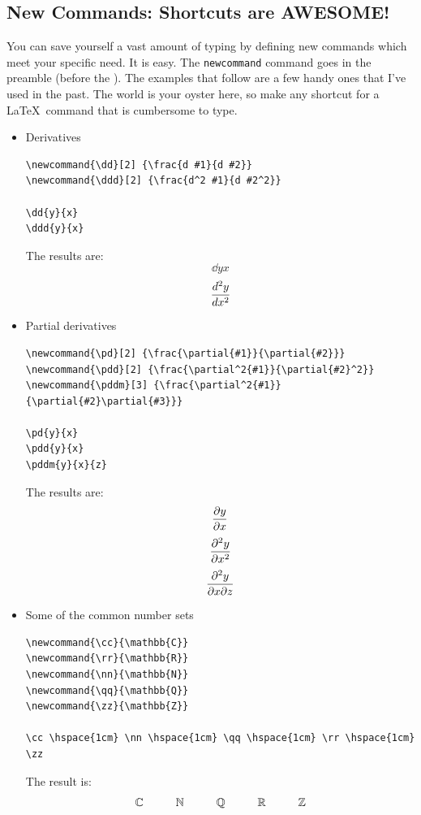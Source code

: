 \subsection{New Commands: Shortcuts are AWESOME!}
You can save yourself a vast amount of typing by defining new commands which meet your
specific need. It is easy. The \texttt{newcommand}  command goes in the preamble (before
the \verb||). The examples that follow are a few handy ones that I've used
in the past.  The world is your oyster here, so make any shortcut for a \LaTeX\ command
that is cumbersome to type.
\begin{itemize}
    \item Derivatives
\begin{verbatim}
\newcommand{\dd}[2] {\frac{d #1}{d #2}}
\newcommand{\ddd}[2] {\frac{d^2 #1}{d #2^2}}

\dd{y}{x}
\ddd{y}{x}
\end{verbatim}

The results are:\\
\[\dd{y}{x}\]
\[\ddd{y}{x}\]

\item Partial derivatives
\begin{verbatim}
\newcommand{\pd}[2] {\frac{\partial{#1}}{\partial{#2}}}
\newcommand{\pdd}[2] {\frac{\partial^2{#1}}{\partial{#2}^2}}
\newcommand{\pddm}[3] {\frac{\partial^2{#1}}{\partial{#2}\partial{#3}}}

\pd{y}{x}
\pdd{y}{x}
\pddm{y}{x}{z}
\end{verbatim}

The results are:\\
\[\pd{y}{x}\]
\[\pdd{y}{x}\]
\[\pddm{y}{x}{z}\]

\item Some of the common number sets
\begin{verbatim}
\newcommand{\cc}{\mathbb{C}}
\newcommand{\rr}{\mathbb{R}}
\newcommand{\nn}{\mathbb{N}}
\newcommand{\qq}{\mathbb{Q}}
\newcommand{\zz}{\mathbb{Z}}

\cc \hspace{1cm} \nn \hspace{1cm} \qq \hspace{1cm} \rr \hspace{1cm} \zz
\end{verbatim}
The result is:
\[\cc \hspace{1cm} \nn \hspace{1cm} \qq \hspace{1cm} \rr \hspace{1cm} \zz\]


\end{itemize}
